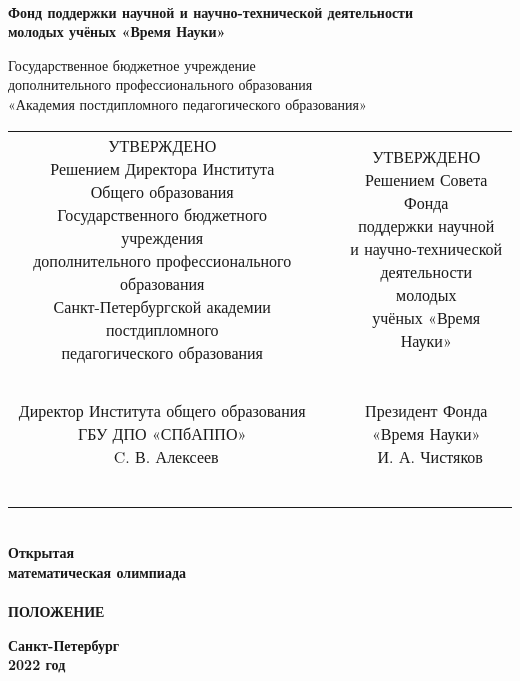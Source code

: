 \thispagestyle{empty}

\begin{center} \large\bf \ \\
	Фонд поддержки научной и научно-технической деятельности \\
	молодых учёных «Время Науки» \bigskip

	Государственное бюджетное учреждение \\
	дополнительного профессионального образования \\
	«Академия постдипломного педагогического образования» \bigskip

\normalsize
\begin{tabular}{ccc}
	\makecell[l]{
		УТВЕРЖДЕНО \\
		Решением Директора Института \\
		Общего образования \\
		Государственного бюджетного учреждения \\
		дополнительного профессионального образования \\
		Санкт-Петербургской академии постдипломного \\
		педагогического образования		
	} & \hspace{0.05cm} &
	\makecell[r]{
		УТВЕРЖДЕНО \\
		Решением Совета Фонда \\
		поддержки научной \\
		и научно-технической \\
		деятельности молодых \\
		учёных «Время Науки»
	} \\ \ & \ \\
	\makecell[l]{
		Директор Института общего образования \\
		ГБУ ДПО «СПбАППО» \\
		\underline{\hspace{2.5cm}}\ C. В. Алексеев
	} & &
	\makecell[r]{
		Президент Фонда \\
		«Время Науки» \\
		\underline{\hspace{2.5cm}}\ И. А. Чистяков
	} \\ \ & \ \\
	\makecell[l]{«\underline{\hspace{1.25cm}}»\ 
		\underline{\hspace{1.75cm}}\ 
		2022 г.}
\end{tabular} \end{center}

\vspace{1cm}

\begin{center} {\LARGE\bf \ \\
	Открытая \\
	математическая олимпиада \\
	\mns \\ [1 cm]
	ПОЛОЖЕНИЕ}
\end{center}

\vfill

\begin{center} \bf
	Санкт-Петербург \\
	2022 год
\end{center}

\newpage
